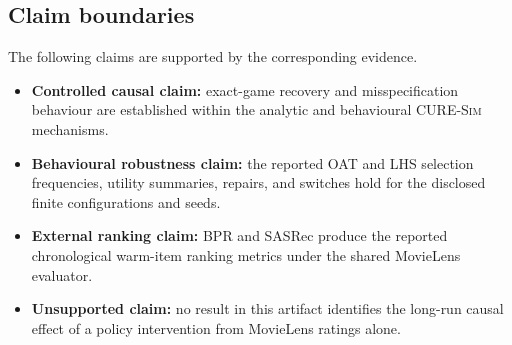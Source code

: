 \documentclass[pdflatex,sn-mathphys-num]{sn-jnl}
\theoremstyle{thmstyleone}
\theoremstyle{thmstyletwo}
\theoremstyle{thmstylethree}
\newcommand{\Sim}{\textsc{CURE-Sim}}
\begin{document}
\begin{appendices}
\section{Claim boundaries}\label{app:claims}
The following claims are supported by the corresponding evidence.
\begin{itemize}
\item \textbf{Controlled causal claim:} exact-game recovery and misspecification behaviour are established within the analytic and behavioural \Sim{} mechanisms.
\item \textbf{Behavioural robustness claim:} the reported OAT and LHS selection frequencies, utility summaries, repairs, and switches hold for the disclosed finite configurations and seeds.
\item \textbf{External ranking claim:} BPR and SASRec produce the reported chronological warm-item ranking metrics under the shared MovieLens evaluator.
\item \textbf{Unsupported claim:} no result in this artifact identifies the long-run causal effect of a policy intervention from MovieLens ratings alone.
\end{itemize}


\end{appendices}
\end{document}
